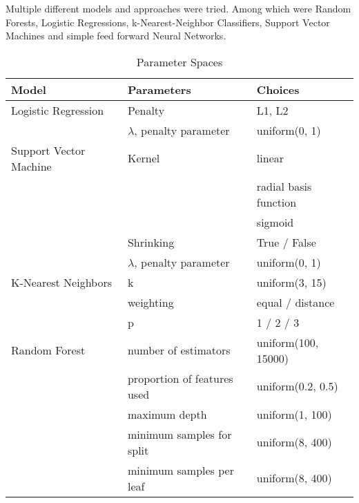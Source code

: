Multiple different models and approaches were tried. Among which were Random Forests, Logistic Regressions, k-Nearest-Neighbor Classifiers, Support Vector Machines and simple feed forward Neural Networks.


\begin{table}
\centering
\caption{Parameter Spaces}
\label{spaces}
\tiny
\begin{tabular}{lll}
\toprule
Model                       & Parameters                  & Choices                                \\ \midrule
Logistic Regression         & Penalty                     & L1, L2                                 \\
                            & $\lambda$, penalty parameter       & uniform(0, 1)                          \\
Support Vector Machine      & Kernel                      & linear \\
                            &                             & radial basis function\\
                            &                             &  sigmoid \\
                            & Shrinking                   & True / False                           \\
                            & $\lambda$, penalty parameter                      & uniform(0, 1)                          \\
K-Nearest Neighbors         & k                           & uniform(3, 15)                         \\
                            & weighting                   & equal / distance                       \\
                            & p                           & 1  / 2 / 3                             \\
Random Forest               & number of estimators        & uniform(100, 15000)                    \\
                            & proportion of features used & uniform(0.2, 0.5)                      \\
                            & maximum depth               & uniform(1, 100)                        \\
                            & minimum samples for split   & uniform(8, 400)                        \\
                            & minimum samples per leaf    & uniform(8, 400)                        \\

\end{tabular}
\end{table}
